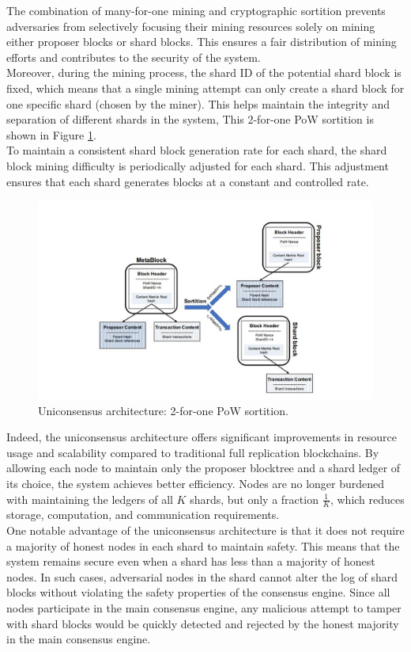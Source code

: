 \documentclass{report}
\begin{document}
The combination of many-for-one mining and cryptographic sortition prevents adversaries from selectively focusing their mining resources solely on mining either proposer blocks or shard blocks. This ensures a fair distribution of mining efforts and contributes to the security of the system.\\
Moreover, during the mining process, the shard ID of the potential shard block is fixed, which means that a single mining attempt can only create a shard block for one specific shard (chosen by the miner). This helps maintain the integrity and separation of different shards in the system, This 2-for-one PoW sortition
is shown in Figure \ref{fig:f3}.\\
To maintain a consistent shard block generation rate for each shard, the shard block mining difficulty is periodically adjusted for each shard. This adjustment ensures that each shard generates blocks at a constant and controlled rate.
\begin{center}
	\begin{figure}
		\centering
		\includegraphics[width=0.8\linewidth]{Fig/F3}
		\caption{Uniconsensus architecture: 2-for-one PoW sortition.}
		\label{fig:f3}
	\end{figure}
\end{center}
Indeed, the uniconsensus architecture offers significant improvements in resource usage and scalability compared to traditional full replication blockchains. By allowing each node to maintain only the proposer blocktree and a shard ledger of its choice, the system achieves better efficiency. Nodes are no longer burdened with maintaining the ledgers of all $K$ shards, but only a fraction $\frac{1}{K}$, which reduces storage, computation, and communication requirements.\\
One notable advantage of the uniconsensus architecture is that it does not require a majority of honest nodes in each shard to maintain safety. This means that the system remains secure even when a shard has less than a majority of honest nodes. In such cases, adversarial nodes in the shard cannot alter the log of shard blocks without violating the safety properties of the consensus engine. Since all nodes participate in the main consensus engine, any malicious attempt to tamper with shard blocks would be quickly detected and rejected by the honest majority in the main consensus engine.\\
\end{document}
